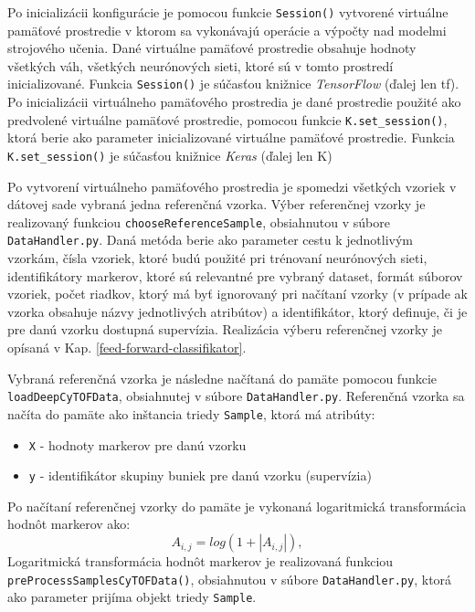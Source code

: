 Po inicializácii konfigurácie je pomocou funkcie \texttt{Session()} vytvorené virtuálne pamäťové prostredie v ktorom sa vykonávajú operácie a výpočty nad modelmi strojového učenia. Dané virtuálne pamäťové prostredie obsahuje hodnoty všetkých váh, všetkých neurónových sieti, ktoré sú v tomto prostredí inicializované. Funkcia \texttt{Session()} je súčasťou knižnice \textit{TensorFlow} (ďalej len tf). Po inicializácii virtuálneho pamäťového prostredia je dané prostredie použité ako predvolené virtuálne pamäťové prostredie, pomocou funkcie \texttt{K.set_session()}, ktorá berie ako parameter inicializované virtuálne pamäťové prostredie. Funkcia \texttt{K.set_session()} je súčasťou knižnice \textit{Keras} (ďalej len K)

Po vytvorení virtuálneho pamäťového prostredia je spomedzi všetkých vzoriek v dátovej sade vybraná jedna referenčná vzorka. Výber referenčnej vzorky je realizovaný funkciou \texttt{chooseReferenceSample}, obsiahnutou v súbore \texttt{DataHandler.py}. Daná metóda berie ako parameter cestu k jednotlivým vzorkám, čísla vzoriek, ktoré budú použité pri trénovaní neurónových sieti, identifikátory markerov, ktoré sú relevantné pre vybraný dataset, formát súborov vzoriek, počet riadkov, ktorý má byť ignorovaný pri načítaní vzorky (v prípade ak vzorka obsahuje názvy jednotlivých atribútov) a identifikátor, ktorý definuje, či je pre danú vzorku dostupná supervízia. Realizácia výberu referenčnej vzorky je opísaná v Kap. \ref{feed-forward-classifikator}.

Vybraná referenčná vzorka je následne načítaná do pamäte pomocou funkcie \texttt{loadDeepCyTOFData}, obsiahnutej v súbore \texttt{DataHandler.py}. Referenčná vzorka sa načíta do pamäte ako inštancia triedy \texttt{Sample}, ktorá má atribúty:
\begin{itemize}
    \item \texttt{X} - hodnoty markerov pre danú vzorku
    \item \texttt{y} - identifikátor skupiny buniek pre danú vzorku (supervízia)
\end{itemize}
Po načítaní referenčnej vzorky do pamäte je vykonaná logaritmická transformácia hodnôt markerov ako:
\begin{equation}
\label{log_transf}
    A_{i,j} = log(1+|A_{i,j}|),
\end{equation}
Logaritmická transformácia hodnôt markerov je realizovaná funkciou \texttt{preProcessSamplesCyTOFData()}, obsiahnutou v súbore \texttt{DataHandler.py}, ktorá ako parameter prijíma objekt triedy \texttt{Sample}. 

